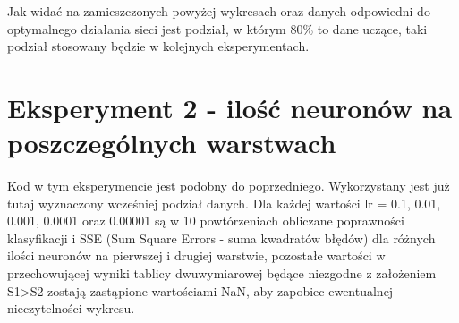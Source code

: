\documentclass[a4paper, 12pt]{report}
\begin{document}
Jak widać na zamieszczonych powyżej wykresach oraz danych odpowiedni do optymalnego działania sieci jest podział, w którym 80\% to dane uczące, taki podział stosowany będzie w kolejnych eksperymentach.


\section{Eksperyment 2 - ilość neuronów na poszczególnych warstwach}
Kod w tym eksperymencie jest podobny do poprzedniego. Wykorzystany jest już tutaj wyznaczony wcześniej podział danych. Dla każdej wartości lr = 0.1, 0.01, 0.001, 0.0001 oraz 0.00001 są w 10 powtórzeniach obliczane poprawności klasyfikacji i SSE (Sum Square Errors - suma kwadratów błędów) dla różnych ilości neuronów na pierwszej  i drugiej warstwie, pozostałe wartości w przechowującej wyniki tablicy dwuwymiarowej będące niezgodne z założeniem S1>S2 zostają zastąpione wartościami NaN, aby zapobiec ewentualnej nieczytelności wykresu.
\end{document}
